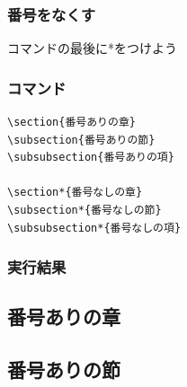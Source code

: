 \documentclass[a4j, titlepage]{jarticle}
\begin{document}
\subsubsection{番号をなくす}
コマンドの最後に*をつけよう

\begin{multicols}{2}

\subsubsection*{コマンド}

\begin{lstlisting}
\section{番号ありの章}
\subsection{番号ありの節}
\subsubsection{番号ありの項}

\section*{番号なしの章}
\subsection*{番号なしの節}
\subsubsection*{番号なしの項}

\end{lstlisting}

\vfill\null
\columnbreak

\subsubsection*{実行結果}
\setcounter{section}{0}
\begin{screen}

    \section{番号ありの章}
    \subsection{番号ありの節}

\end{screen}
\end{multicols}
\end{document}
